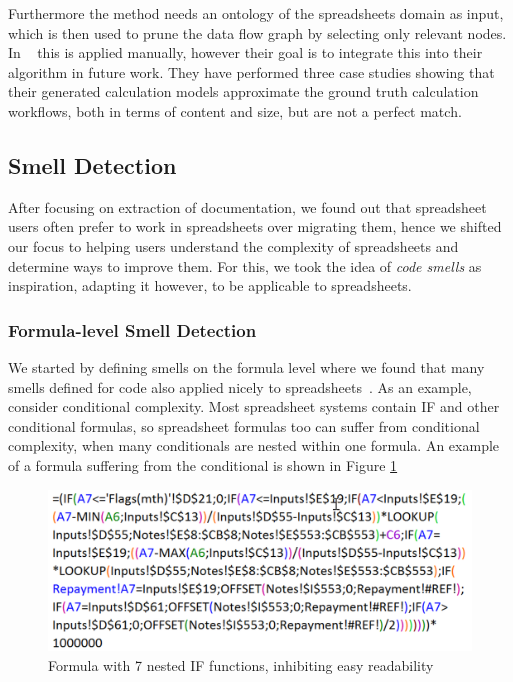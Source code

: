 \documentclass[conference]{IEEEtran}
\begin{document}
Furthermore the method needs an ontology of the spreadsheets domain as input, which is then used to prune the data flow graph by selecting only relevant nodes. In ~\cite{de_vos_methodology_2015} this is applied manually, however their goal is to integrate this into their algorithm in future work. They have performed three case studies showing that their generated calculation models
approximate the ground truth calculation workflows, both in terms of content and size, but are not a perfect match.

\subsection{Smell Detection} 
After focusing on extraction of documentation, we found out that spreadsheet users often prefer to work in spreadsheets over migrating them, hence we shifted our focus to helping users understand the complexity of spreadsheets and determine ways to improve them. For this, we took the idea of \emph{code smells} as inspiration, adapting it however, to be applicable to spreadsheets. 

\subsubsection{Formula-level Smell Detection}
We started by defining smells on the formula level where we found that many smells defined for code also applied nicely to spreadsheets~\cite{hermans_detecting_2014}. As an example, consider conditional complexity. Most spreadsheet systems contain IF and other conditional formulas, so spreadsheet formulas too can suffer from conditional complexity, when many conditionals are nested within one formula. An example of a formula suffering from the conditional is shown in Figure \ref{fig:ConditionalComplexity}

\begin{figure}
  \begin{center}
  \includegraphics[width=\columnwidth]{fig/ConditionalComplexity.png}
  \caption{Formula with 7 nested IF functions, inhibiting easy readability}
  \label{fig:ConditionalComplexity}
  \end{center}
\end{figure} 
\end{document}
